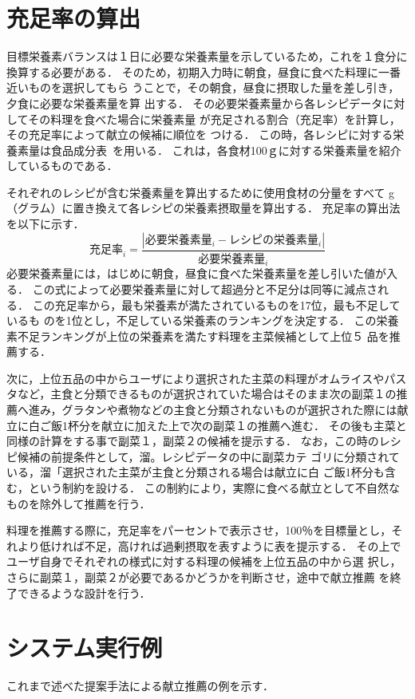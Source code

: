 \documentclass[11pt,titlepage,uplatex]{ujreport}
\begin{document}
\section{充足率の算出}
目標栄養素バランスは１日に必要な栄養素量を示しているため，これを１食分に
換算する必要がある．
そのため，初期入力時に朝食，昼食に食べた料理に一番近いものを選択してもら
うことで，その朝食，昼食に摂取した量を差し引き，夕食に必要な栄養素量を算
出する．
その必要栄養素量から各レシピデータに対してその料理を食べた場合に栄養素量
が充足される割合（充足率）を計算し，その充足率によって献立の候補に順位を
つける．
この時，各レシピに対する栄養素量は食品成分表~\cite{jikkyo10}を用いる．
これは，各食材100ｇに対する栄養素量を紹介しているものである．

 それぞれのレシピが含む栄養素量を算出するために使用食材の分量をすべて
 g（グラム）に置き換えて各レシピの栄養素摂取量を算出する．
 充足率の算出法を以下に示す．
\begin{equation}
充足率_i = \frac{|必要栄養素量_i - レシピの栄養素量_i|}{必要栄養素量_i}
\end{equation}
必要栄養素量には，はじめに朝食，昼食に食べた栄養素量を差し引いた値が入る．
この式によって必要栄養素量に対して超過分と不足分は同等に減点される．
この充足率から，最も栄養素が満たされているものを17位，最も不足しているも
のを1位とし，不足している栄養素のランキングを決定する．
この栄養素不足ランキングが上位の栄養素を満たす料理を主菜候補として上位５
品を推薦する．

次に，上位五品の中からユーザにより選択された主菜の料理がオムライスやパス
タなど，主食と分類できるものが選択されていた場合はそのまま次の副菜１の推
薦へ進み，グラタンや煮物などの主食と分類されないものが選択された際には献
立に白ご飯1杯分を献立に加えた上で次の副菜１の推薦へ進む．
その後も主菜と同様の計算をする事で副菜１，副菜２の候補を提示する．
なお，この時のレシピ候補の前提条件として，溜。レシピデータの中に副菜カテ
ゴリに分類されている，溜「選択された主菜が主食と分類される場合は献立に白
ご飯1杯分も含む，という制約を設ける．
この制約により，実際に食べる献立として不自然なものを除外して推薦を行う．

料理を推薦する際に，充足率をパーセントで表示させ，100％を目標量とし，そ
れより低ければ不足，高ければ過剰摂取を表すように表を提示する．
その上でユーザ自身でそれぞれの様式に対する料理の候補を上位五品の中から選
択し，さらに副菜１，副菜２が必要であるかどうかを判断させ，途中で献立推薦
を終了できるような設計を行う．

\section{システム実行例}
これまで述べた提案手法による献立推薦の例を示す．
\end{document}
